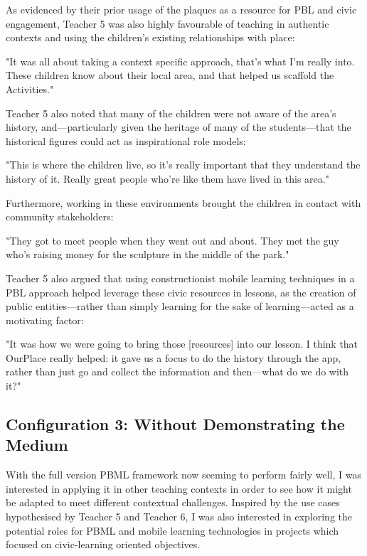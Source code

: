 As evidenced by their prior usage of the plaques as a resource for PBL and civic engagement, Teacher 5 was also highly favourable of teaching in authentic contexts and using the children's existing relationships with place: 

\begin{displayquote}
"It was all about taking a context specific approach, that's what I'm really into. These children know about their local area, and that helped us scaffold the Activities."
\end{displayquote}

Teacher 5 also noted that many of the children were not aware of the area's history, and---particularly given the heritage of many of the students---that the historical figures could act as inspirational role models: 

\begin{displayquote}
"This is where the children live, so it's really important that they understand the history of it. Really great people who're like them have lived in this area."
\end{displayquote}

Furthermore, working in these environments brought the children in contact with community stakeholders: 

\begin{displayquote}
"They got to meet people when they went out and about. They met the guy who's raising money for the sculpture in the middle of the park."
\end{displayquote}

Teacher 5 also argued that using constructionist mobile learning techniques in a PBL approach helped leverage these civic resources in lessons, as the creation of public entities---rather than simply learning for the sake of learning---acted as a motivating factor: 

\begin{displayquote}
"It was how we were going to bring those [resources] into our lesson. I think that OurPlace really helped: it gave us a focus to do the history through the app, rather than just go and collect the information and then---what do we do with it?"
\end{displayquote}

\subsection{Configuration 3: Without Demonstrating the Medium}
With the full version PBML framework now seeming to perform fairly well, I was interested in applying it in other teaching contexts in order to see how it might be adapted to meet different contextual challenges. Inspired by the use cases hypothesised by Teacher 5 and Teacher 6, I was also interested in exploring the potential roles for PBML and mobile learning technologies in projects which focused on civic-learning oriented objectives.


